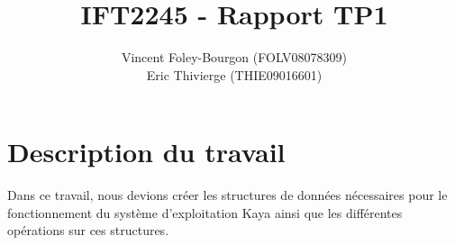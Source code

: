 \documentclass[10pt]{article}
\begin{document}
\title{IFT2245 - Rapport TP1}
\author{Vincent Foley-Bourgon (FOLV08078309) \\
Eric Thivierge (THIE09016601)}
\maketitle

\section{Description du travail}

Dans ce travail, nous devions créer les structures de données
nécessaires pour le fonctionnement du système d'exploitation Kaya
ainsi que les différentes opérations sur ces structures.
\end{document}
